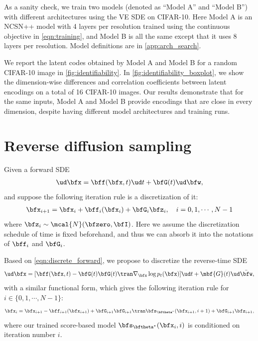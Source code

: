 As a sanity check, we train two models (denoted as ``Model A'' and ``Model B'') with different architectures using the VE SDE on CIFAR-10. Here Model A is an NCSN++ model with 4 layers per resolution trained using the continuous objective in \cref{eqn:training}, and Model B is all the same except that it uses 8 layers per resolution. Model definitions are in \cref{app:arch_search}. 

We report the latent codes obtained by Model A and Model B for a random CIFAR-10 image in \cref{fig:identifiability}. In \cref{fig:identifiability_boxplot}, we show the dimension-wise differences and correlation coefficients between latent encodings on a total of 16 CIFAR-10 images. Our results demonstrate that for the same inputs, Model A and Model B provide encodings that are close in every dimension, despite having different model architectures and training runs.


\section{Reverse diffusion sampling}\label{app:reverse_diffusion}
Given a forward SDE 
\begin{align*}
    \ud \bfx = \bff(\bfx, t) \ud t + \bfG(t) \ud \bfw,
\end{align*}
and suppose the following iteration rule is a discretization of it:
\begin{align}
    \bfx_{i+1} = \bfx_i + \bff_i(\bfx_i) + \bfG_i \bfz_i, \quad i = 0, 1, \cdots, N-1 \label{eqn:discrete_forward}
\end{align}
where $\bfz_i \sim \mcal{N}(\bfzero, \bfI)$. Here we assume the discretization schedule of time is fixed beforehand, and thus we can absorb it into the notations of $\bff_i$ and $\bfG_i$.

Based on \cref{eqn:discrete_forward}, we propose to discretize the reverse-time SDE
\begin{align*}
\ud \bfx = [\bff(\bfx, t) - \bfG(t)\bfG(t)\tran  \nabla_\bfx  \log p_t(\bfx)] \ud t + \mbf{G}(t) \ud \bar{\bfw},
\end{align*}
with a similar functional form, which gives the following iteration rule for $i \in \{0, 1, \cdots, N-1\}$:
\begin{align}
    \bfx_{i} = \bfx_{i+1} -\bff_{i+1}(\bfx_{i+1}) + \bfG_{i+1}\bfG_{i+1}\tran \bfs_{\bftheta^*}(\bfx_{i+1}, i+1) + \bfG_{i+1}\bfz_{i+1}, \label{eqn:discrete_backward}
\end{align}
where our trained score-based model $\bfs_{\bftheta^*}(\bfx_i, i)$ is conditioned on iteration number $i$.

